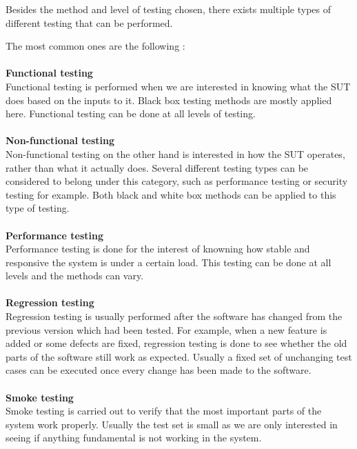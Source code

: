\documentclass[english,12pt,a4paper,pdftex,elec,utf8]{aaltothesis}
\begin{document}
Besides the method and level of testing chosen, there exists multiple types of different testing that can be performed. \cite{sularikurssi, embeddedsofteng, testingcomplex}\par 
The most common ones are the following \cite{sularikurssi}:\\
\\
\textbf{Functional testing}\\
Functional testing is performed when we are interested in knowing what the SUT does based on the inputs to it. Black box testing methods are mostly applied here. Functional testing can be done at all levels of testing.
\\
\\ 
\textbf{Non-functional testing}\\
Non-functional testing on the other hand is interested in how the SUT operates, rather than what it actually does. Several different testing types can be considered to belong under this category, such as performance testing or security testing for example. Both black and white box methods can be applied to this type of testing.
\\
\\ 
\textbf{Performance testing}\\
Performance testing is done for the interest of knowning how stable and responsive the system is under a certain load. This testing can be done at all levels and the methods can vary.
\\
\\ 
\textbf{Regression testing}\\
Regression testing is usually performed after the software has changed from the previous version which had been tested. For example, when a new feature is added or some defects are fixed, regression testing is done to see whether the old parts of the software still work as expected. Usually a fixed set of unchanging test cases can be executed once every change has been made to the software.
\\
\\ 
\textbf{Smoke testing}\\
Smoke testing is carried out to verify that the most important parts of the system work properly. Usually the test set is small as we are only interested in seeing if anything fundamental is not working in the system.
\end{document}
